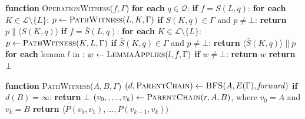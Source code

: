 \begin{algorithm}[t]
\caption{Operation witnesses}
\label{alg:operation-witness}
\begin{algorithmic}[1]
\raggedright
\STATE \textbf{function} \textsc{OperationWitness}(\(f,\Gamma\))
\STATE \textbf{for each} \(q\in\mathcal Q\):
\STATE \hspace{\algorithmicindent}\textbf{if} \(f=S(L,q)\):
\STATE \hspace{2\algorithmicindent}\textbf{for each} \(K\in\mathcal L\setminus\{L\}\):
\STATE \hspace{3\algorithmicindent}\(p\leftarrow\textsc{PathWitness}(L,K,\Gamma)\)
\STATE \hspace{3\algorithmicindent}\textbf{if} \(S(K,q)\in\Gamma\) and \(p\neq\bot\):
\STATE \hspace{4\algorithmicindent}\textbf{return} \(p\mathbin{\|}\langle S(K,q)\rangle\)
\STATE \hspace{\algorithmicindent}\textbf{if} \(f=\bar S(L,q)\):
\STATE \hspace{2\algorithmicindent}\textbf{for each} \(K\in\mathcal L\setminus\{L\}\):
\STATE \hspace{3\algorithmicindent}\(p\leftarrow\textsc{PathWitness}(K,L,\Gamma)\)
\STATE \hspace{3\algorithmicindent}\textbf{if} \(\bar S(K,q)\in\Gamma\) and \(p\neq\bot\):
\STATE \hspace{4\algorithmicindent}\textbf{return} \(\langle\bar S(K,q)\rangle\mathbin{\|}p\)
\STATE \textbf{for each} lemma \(l\) in :
\STATE \hspace{\algorithmicindent}\(w\leftarrow \textsc{LemmaApplies}(l,f,\Gamma)\)
\STATE \hspace{\algorithmicindent}\textbf{if} \(w\neq\bot\): \textbf{return} \(w\)
\STATE \textbf{return} \(\bot\)
\end{algorithmic}
\end{algorithm}

\begin{algorithm}[t]
\caption{Path witnesses}
\label{alg:path-search}
\begin{algorithmic}[1]
\raggedright
\STATE \textbf{function} \textsc{PathWitness}(\(A,B,\Gamma\))
\STATE \((d,\textsc{ParentChain})\leftarrow\textsc{BFS}(A,E(\Gamma),\mathit{forward})\)
\STATE \textbf{if} \(d(B)=\infty\): \textbf{return} \(\bot\)
\STATE \((v_0,\ldots,v_k)\leftarrow\textsc{ParentChain}(r,A,B)\),
       where \(v_0=A\) and \(v_k=B\)
\STATE \textbf{return}
       \(\langle P(v_0,v_1),\ldots,P(v_{k-1},v_k)\rangle\)
\end{algorithmic}
\end{algorithm}

